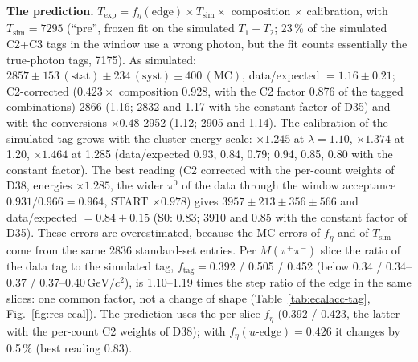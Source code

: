 \documentclass[11pt,a4paper]{article}
\newcommand{\piz}{\ensuremath{\pi^{0}}\xspace}
\newcommand{\Mpipi}{\ensuremath{M(\pi^{+}\pi^{-})}\xspace}
\newcommand{\GeVcc}{\ensuremath{\mathrm{GeV}/c^{2}}\xspace}
\newcommand{\code}[1]{\texttt{\detokenize{#1}}}
\newcommand{\tabin}[1]{}
\begin{document}
\textbf{The prediction.} $T_{\mathrm{exp}}=f_\eta(\mathrm{edge})\times T_{\mathrm{sim}}\times$ composition $\times$ calibration, with
$T_{\mathrm{sim}}=7295$ (``pre'', frozen fit on the simulated $T_1+T_2$; 23\,\% of the simulated C2+C3 tags in the window use a wrong photon, but the
fit counts essentially the true-photon tags, 7175). As simulated: $2857\pm153\,(\mathrm{stat})\pm234\,(\mathrm{syst})\pm400\,(\mathrm{MC})$, data/expected
$=1.16\pm0.21$; C2-corrected ($0.423\times$ composition 0.928, with the C2 factor 0.876 of the tagged combinations) 2866 (1.16; 2832 and 1.17 with the
constant factor of D35) and with the conversions $\times0.48$ 2952 (1.12; 2905 and 1.14). The calibration of the simulated tag grows with the
cluster energy scale: $\times1.245$ at $\lambda=1.10$, $\times1.374$ at 1.20, $\times1.464$ at 1.285 (data/expected 0.93, 0.84, 0.79; 0.94,
0.85, 0.80 with the constant factor). The best reading (C2 corrected with the per-count weights of D38, energies $\times1.285$, the wider \piz of
the data through the window acceptance $0.931/0.966=0.964$, START $\times0.978$) gives $3957\pm213\pm356\pm566$ and data/expected $=0.84\pm0.15$
(S0: 0.83; 3910 and 0.85 with the constant factor of D35). These errors are overestimated, because the MC errors of $f_\eta$ and of
$T_{\mathrm{sim}}$ come from the same 2836 standard-set entries. Per \Mpipi slice
the ratio of the data tag to the simulated tag, $f_{\mathrm{tag}}=0.392$ / 0.505 / 0.452 (below 0.34 / 0.34--0.37 / 0.37--0.40\,\GeVcc), is 1.10--1.19
times the step ratio of the edge in the same slices: one common factor, not a change of shape (Table~\ref{tab:ecalacc-tag}, Fig.~\ref{fig:res-ecal}).
The prediction uses the per-slice $f_\eta$ (0.392 / 0.423, the latter with the per-count C2 weights of D38); with $f_\eta(u\text{-edge})=0.426$
it changes by 0.5\,\% (best reading 0.83).

\begin{table}[H]
\centering
\caption{\textbf{What it shows: the tagged $\eta$ of the data against the expectation, per \Mpipi slice.} ``pre''; $T$ data from the frozen fit;
$T_{\mathrm{sim}}$ the same fit on the simulated $T_1+T_2$; $f_{\mathrm{tag}}=T/T_{\mathrm{sim}}$; $T_{\mathrm{exp}}$ with the C2-corrected
$f_\eta(\mathrm{edge})=0.418$ of D35, as simulated and with the cluster energies $\times1.285$; with the per-count C2 weights of D38 ($f_\eta=0.423$)
every $T_{\mathrm{exp}}$ is 1.2\,\% higher and its error about 3\,\% larger (peak-tail family of D40). The errors of $T_{\mathrm{exp}}$ are the
total (stat $\oplus$ syst $\oplus$ MC) and overestimated (the MC errors of $f_\eta$ and of $T_{\mathrm{sim}}$ come from the same simulated entries).
The best reading (with the D38 weights and the data resolution and START factors, 3957, data/expected 0.84) is given in the text only. Source: \code{tables_all/ecalacc_tag.txt}.}
\label{tab:ecalacc-tag}
\footnotesize
\tabin{ecalacc_tag.tex}
\end{table}
\end{document}
